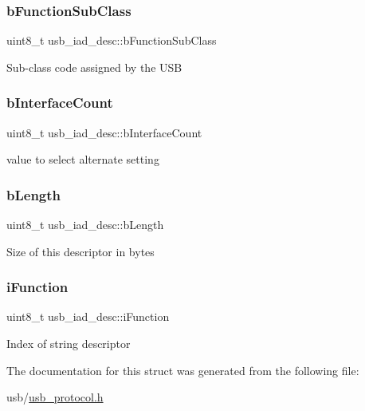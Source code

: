 \subsubsection{\texorpdfstring{b\+Function\+Sub\+Class}{bFunctionSubClass}}
{\footnotesize\ttfamily uint8\+\_\+t usb\+\_\+iad\+\_\+desc\+::b\+Function\+Sub\+Class}

Sub-\/class code assigned by the U\+SB \mbox{\label{structusb__iad__desc_afa291ce945a183562d154a0d9918ff74}} 
\subsubsection{\texorpdfstring{b\+Interface\+Count}{bInterfaceCount}}
{\footnotesize\ttfamily uint8\+\_\+t usb\+\_\+iad\+\_\+desc\+::b\+Interface\+Count}

value to select alternate setting \mbox{\label{structusb__iad__desc_afd6d58806e3bf63b00d3b56ef3df0a41}} 
\subsubsection{\texorpdfstring{b\+Length}{bLength}}
{\footnotesize\ttfamily uint8\+\_\+t usb\+\_\+iad\+\_\+desc\+::b\+Length}

Size of this descriptor in bytes \mbox{\label{structusb__iad__desc_a99c7398765df8c1efa6f8e9972e8886c}} 
\subsubsection{\texorpdfstring{i\+Function}{iFunction}}
{\footnotesize\ttfamily uint8\+\_\+t usb\+\_\+iad\+\_\+desc\+::i\+Function}

Index of string descriptor 

The documentation for this struct was generated from the following file\+:\begin{DoxyCompactItemize}
\item 
usb/\hyperlink{usb__protocol_8h}{usb\+\_\+protocol.\+h}\end{DoxyCompactItemize}

